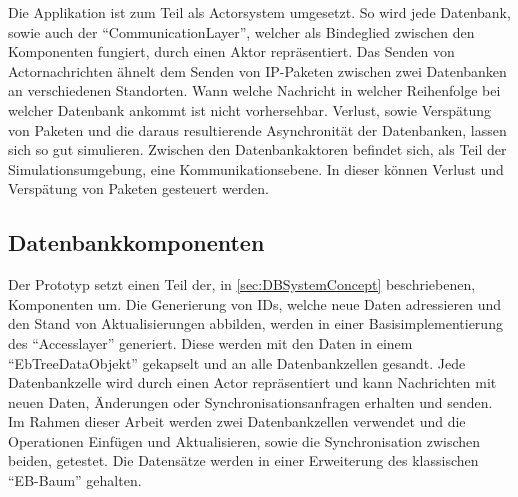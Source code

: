 \documentclass[a4paper,11pt,oneside,%
headsepline,												%
footsepline,												%
bibtotocnumbered									%
]{scrreprt}
\begin{document}
\newpage
Die Applikation ist zum Teil als Actorsystem umgesetzt. So wird jede Datenbank, sowie auch der \enquote{CommunicationLayer}, welcher als Bindeglied zwischen den Komponenten fungiert, durch einen Aktor repräsentiert.
Das Senden von Actornachrichten ähnelt dem Senden von IP-Paketen zwischen zwei Datenbanken an verschiedenen Standorten. Wann welche Nachricht in welcher Reihenfolge bei welcher Datenbank ankommt ist nicht vorhersehbar. Verlust, sowie Verspätung von Paketen und die daraus resultierende Asynchronität der Datenbanken, lassen sich so gut simulieren.
Zwischen den Datenbankaktoren befindet sich, als Teil der Simulationsumgebung, eine Kommunikationsebene. In dieser können Verlust und Verspätung von Paketen gesteuert werden.


\subsection{Datenbankkomponenten}
Der Prototyp setzt einen Teil der, in \autoref{sec:DBSystemConcept} beschriebenen, Komponenten um. Die Generierung von IDs, welche neue Daten adressieren und den Stand von Aktualisierungen abbilden, werden in einer Basisimplementierung des \enquote{Accesslayer} generiert. Diese werden mit den Daten in einem \enquote{EbTreeDataObjekt} gekapselt und an alle Datenbankzellen gesandt. Jede Datenbankzelle wird durch einen Actor repräsentiert und kann Nachrichten mit neuen Daten, Änderungen oder Synchronisationsanfragen erhalten und senden. Im Rahmen dieser Arbeit werden zwei Datenbankzellen verwendet und die Operationen Einfügen und Aktualisieren, sowie die Synchronisation zwischen beiden, getestet. Die Datensätze werden in einer Erweiterung des klassischen \enquote{EB-Baum} gehalten.
\end{document}
